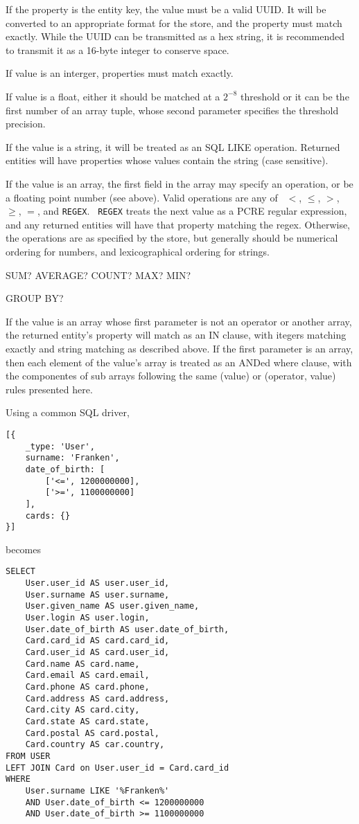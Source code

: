 \documentclass{article}
\begin{document}
If the property is the entity key, the value must be a valid UUID. It will be
converted to an appropriate format for the store, and the property must match
exactly. While the UUID can be transmitted as a hex string, it is recommended to
transmit it as a 16-byte integer to conserve space.

If value is an interger, properties must match exactly.

If value is a float, either it should be matched at a $2^{-8}$ threshold or it
can be the first number of an array tuple, whose second parameter specifies the
threshold precision.

If the value is a string, it will be treated as an SQL LIKE operation.
Returned entities will have properties whose values contain the string (case
sensitive).

If the value is an array, the first field in the array may specify an operation,
or be a floating point number (see above). Valid operations are any of {\tt
$<$}, {\tt $\le$}, {\tt $>$}, {\tt $\ge$}, {\tt $=$}, and {\tt REGEX}. {\tt
REGEX} treats the next value as a PCRE regular expression, and any returned
entities will have that property matching the regex. Otherwise, the operations
are as specified by the store, but generally should be numerical ordering for
numbers, and lexicographical ordering for strings.

SUM? AVERAGE? COUNT? MAX? MIN?

GROUP BY?

If the value is an array whose first parameter is not an operator or another
array, the returned entity's property will match as an IN clause, with itegers
matching exactly and string matching as described above. If the first parameter
is an array, then each element of the value's array is treated as an ANDed where
clause, with the componentes of sub arrays following the same (value) or
(operator, value) rules presented here.

Using a common SQL driver,
\linespread{1}
\begin{lstlisting}
[{
	_type: 'User',
	surname: 'Franken',
	date_of_birth: [
		['<=', 1200000000],
		['>=', 1100000000]
	],
	cards: {}
}]
\end{lstlisting}
\linespread{1.6}
becomes
\linespread{1}
\begin{lstlisting}
SELECT
	User.user_id AS user.user_id,
	User.surname AS user.surname,
	User.given_name AS user.given_name,
	User.login AS user.login,
	User.date_of_birth AS user.date_of_birth,
	Card.card_id AS card.card_id,
	Card.user_id AS card.user_id,
	Card.name AS card.name,
	Card.email AS card.email,
	Card.phone AS card.phone,
	Card.address AS card.address,
	Card.city AS card.city,
	Card.state AS card.state,
	Card.postal AS card.postal,
	Card.country AS car.country,
FROM USER
LEFT JOIN Card on User.user_id = Card.card_id
WHERE
	User.surname LIKE '%Franken%'
	AND User.date_of_birth <= 1200000000
	AND User.date_of_birth >= 1100000000
\end{lstlisting}
\end{document}
